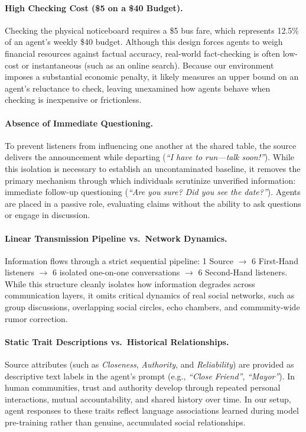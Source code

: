 \documentclass[letterpaper]{article} %
\begin{document}
\paragraph{High Checking Cost (\$5 on a \$40 Budget).}
Checking the physical noticeboard requires a \$5 bus fare, which represents 12.5\% of an agent's weekly \$40 budget. Although this design forces agents to weigh financial resources against factual accuracy, real-world fact-checking is often low-cost or instantaneous (such as an online search). Because our environment imposes a substantial economic penalty, it likely measures an upper bound on an agent's reluctance to check, leaving unexamined how agents behave when checking is inexpensive or frictionless.

\paragraph{Absence of Immediate Questioning.}
To prevent listeners from influencing one another at the shared table, the source delivers the announcement while departing (\textit{``I have to run---talk soon!''}). While this isolation is necessary to establish an uncontaminated baseline, it removes the primary mechanism through which individuals scrutinize unverified information: immediate follow-up questioning (\textit{``Are you sure? Did you see the date?''}). Agents are placed in a passive role, evaluating claims without the ability to ask questions or engage in discussion.

\paragraph{Linear Transmission Pipeline vs.\ Network Dynamics.}
Information flows through a strict sequential pipeline: 1 Source $\to$ 6 First-Hand listeners $\to$ 6 isolated one-on-one conversations $\to$ 6 Second-Hand listeners. While this structure cleanly isolates how information degrades across communication layers, it omits critical dynamics of real social networks, such as group discussions, overlapping social circles, echo chambers, and community-wide rumor correction.

\paragraph{Static Trait Descriptions vs.\ Historical Relationships.}
Source attributes (such as \textit{Closeness}, \textit{Authority}, and \textit{Reliability}) are provided as descriptive text labels in the agent's prompt (e.g., \textit{``Close Friend''}, \textit{``Mayor''}). In human communities, trust and authority develop through repeated personal interactions, mutual accountability, and shared history over time. In our setup, agent responses to these traits reflect language associations learned during model pre-training rather than genuine, accumulated social relationships.
\end{document}
